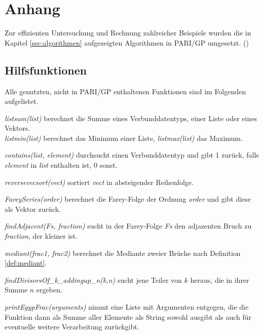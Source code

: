 \section{Anhang}
Zur effizienten Untersuchung und Rechnung zahlreicher Beispiele wurden die in Kapitel \ref{sec:algorithmen} aufgezeigten Algorithmen in PARI/GP umgesetzt. (\cite{PARI2018})\\
\subsection{Hilfsfunktionen}
Alle genutzten, nicht in PARI/GP enthaltenen Funktionen sind im Folgenden aufgelistet.

\emph{listsum(list)} berechnet die Summe eines Verbunddatentyps, \bspw einer Liste oder eines Vektors.\\ \emph{listmin(list)} berechnet das Minimum einer Liste, \emph{listmax(list)} das Maximum.


\emph{contains(list, element)} durchsucht einen Verbunddatentyp und gibt 1 zurück, falls \emph{element} in \emph{list} enthalten ist, 0 sonst.


\emph{reversevecsort(vect)} sortiert \emph{vect} in absteigender Reihenfolge.


\emph{FareySeries(order)} berechnet die Farey-Folge der Ordnung \emph{order} und gibt diese als Vektor zurück.


\emph{findAdjacent(Fs, fraction)} sucht in der Farey-Folge \emph{Fs} den adjazenten Bruch zu \emph{fraction}, der kleiner ist.


\emph{mediant(frac1, frac2)} berechnet die Mediante zweier Brüche nach Definition \ref{def:mediant}.


\emph{findDivisorsOf\_k\_addingup\_n(k,n)} sucht jene Teiler von $k$ heraus, die in ihrer Summe $n$ ergeben.


\emph{printEgypFrac(arguments)} nimmt eine Liste mit Argumenten entgegen, die die Funktion dann als Summe aller Elemente als String sowohl ausgibt als auch für eventuelle weitere Verarbeitung zurückgibt.



